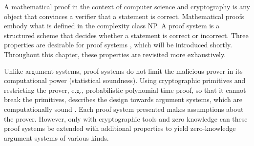 A mathematical proof in the context of computer science and cryptography is any object that convinces a verifier that a statement is correct. Mathematical proofs embody what is defined in the complexity class NP. A proof system is a structured scheme that decides whether a statement is correct or incorrect. Three properties are desirable for proof systems \citep{GoldwasserIPs}, which will be introduced shortly. Throughout this chapter, these properties are revisited more exhaustively.
\begin{itemize}
\end{itemize}
Unlike argument systems, proof systems do not limit the malicious prover in its computational power (statistical soundness). Using cryptographic primitives and restricting the prover, e.g., probabilistic polynomial time proof, so that it cannot break the primitives, describes the design towards argument systems, which are computationally sound \citep{ArgSystems, MicaliArgSys}. Each proof system presented makes assumptions about the prover. However, only with cryptographic tools and zero knowledge can these proof systems be extended with additional properties to yield zero-knowledge argument systems of various kinds.

